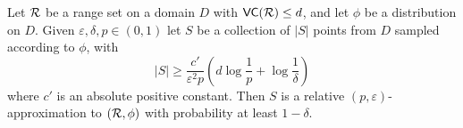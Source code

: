 \begin{theorem}\label{thm:releapprox}
  Let $\mathcal{R}$ be a range set on a domain $D$ with
  $\mathsf{VC}(\mathcal{R})\le d$, and let $\phi$ be a distribution on $D$. Given
  $\varepsilon,\delta,p\in(0,1)$ let $S$ be a collection of $|S|$ points from $D$
  sampled according to $\phi$, with 
  \begin{equation}\label{eq:releapprox}
    |S|\ge\frac{c'}{\varepsilon^2p}\left(d\log\frac{1}{p}+\log\frac{1}{\delta}\right)
  \end{equation}
  where $c'$ is an absolute positive constant. Then $S$ is a relative
  $(p,\varepsilon)$-approximation to $(\mathcal{R},\phi)$ with probability at least
  $1-\delta$.
\end{theorem}

